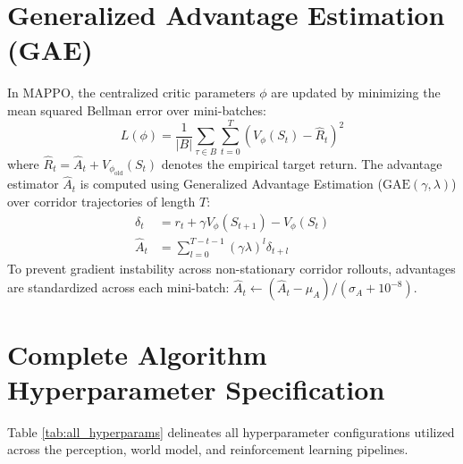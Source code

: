 \documentclass[12pt,a4paper,oneside]{report}
\begin{document}
\section{Generalized Advantage Estimation (GAE)}
In MAPPO, the centralized critic parameters $\phi$ are updated by minimizing the mean squared Bellman error over mini-batches:
\begin{equation}
L(\phi) = \frac{1}{|B|} \sum_{\tau \in B} \sum_{t=0}^T \left( V_\phi(S_t) - \hat{R}_t \right)^2
\end{equation}
where $\hat{R}_t = \hat{A}_t + V_{\phi_{\text{old}}}(S_t)$ denotes the empirical target return. The advantage estimator $\hat{A}_t$ is computed using Generalized Advantage Estimation ($\text{GAE}(\gamma, \lambda)$) over corridor trajectories of length $T$:
\begin{align}
\delta_t &= r_t + \gamma V_\phi(S_{t+1}) - V_\phi(S_t) \\
\hat{A}_t &= \sum_{l=0}^{T - t - 1} (\gamma \lambda)^l \delta_{t+l}
\end{align}
To prevent gradient instability across non-stationary corridor rollouts, advantages are standardized across each mini-batch: $\hat{A}_t \leftarrow (\hat{A}_t - \mu_A) / (\sigma_A + 10^{-8})$.

\section{Complete Algorithm Hyperparameter Specification}
Table \ref{tab:all_hyperparams} delineates all hyperparameter configurations utilized across the perception, world model, and reinforcement learning pipelines.
\end{document}
